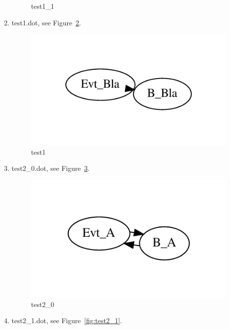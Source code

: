 \documentclass[12pt,a4paper]{report}
\begin{document}
\begin{enumerate}
\begin{figure}
        \caption{test1\_1}
        \label{fig:test1_1}
    \end{figure}
\item test1.dot, see Figure~\ref{fig:test1}.
    \begin{figure}
        \centering 
        \includegraphics*[width=1.0\textwidth,keepaspectratio]{TestPattern/test1.pdf}
        \caption{test1}
        \label{fig:test1}
    \end{figure}
\item test2\_0.dot, see Figure~\ref{fig:test2_0}.
    \begin{figure}
        \centering 
        \includegraphics*[width=1.0\textwidth,keepaspectratio]{TestPattern/test2_0.pdf}
        \caption{test2\_0}
        \label{fig:test2_0}
    \end{figure}
\item test2\_1.dot, see Figure~\ref{fig:test2_1}.
    \begin{figure}
        \centering 

\end{figure}
\end{enumerate}
\end{document}
